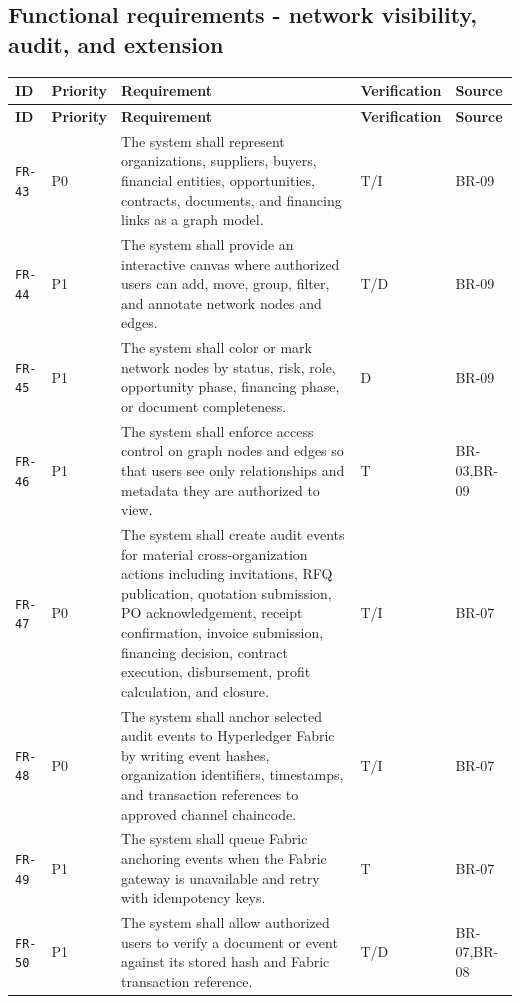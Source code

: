 \documentclass[11pt,a4paper]{article}
\begin{document}
\subsection{Functional requirements - network visibility, audit, and extension}\label{sec:fr-network}
\begin{footnotesize}
\begin{longtable}{@{}p{}p{}p{}p{}p{}@{}}
\rowcolor{gray!18}\textbf{ID} & \textbf{Priority} & \textbf{Requirement} & \textbf{Verification} & \textbf{Source} \\ \hline
\endfirsthead
\rowcolor{gray!18}\textbf{ID} & \textbf{Priority} & \textbf{Requirement} & \textbf{Verification} & \textbf{Source} \\ \hline
\endhead
\texttt{FR-43} & P0 & The system shall represent organizations, suppliers, buyers, financial entities, opportunities, contracts, documents, and financing links as a graph model. & T/I & BR-09 \\ \hline
\texttt{FR-44} & P1 & The system shall provide an interactive canvas where authorized users can add, move, group, filter, and annotate network nodes and edges. & T/D & BR-09 \\ \hline
\texttt{FR-45} & P1 & The system shall color or mark network nodes by status, risk, role, opportunity phase, financing phase, or document completeness. & D & BR-09 \\ \hline
\texttt{FR-46} & P1 & The system shall enforce access control on graph nodes and edges so that users see only relationships and metadata they are authorized to view. & T & BR-03,BR-09 \\ \hline
\texttt{FR-47} & P0 & The system shall create audit events for material cross-organization actions including invitations, RFQ publication, quotation submission, PO acknowledgement, receipt confirmation, invoice submission, financing decision, contract execution, disbursement, profit calculation, and closure. & T/I & BR-07 \\ \hline
\texttt{FR-48} & P0 & The system shall anchor selected audit events to Hyperledger Fabric by writing event hashes, organization identifiers, timestamps, and transaction references to approved channel chaincode. & T/I & BR-07 \\ \hline
\texttt{FR-49} & P1 & The system shall queue Fabric anchoring events when the Fabric gateway is unavailable and retry with idempotency keys. & T & BR-07 \\ \hline
\texttt{FR-50} & P1 & The system shall allow authorized users to verify a document or event against its stored hash and Fabric transaction reference. & T/D & BR-07,BR-08 \\ \hline

\end{longtable}
\end{footnotesize}
\end{document}
